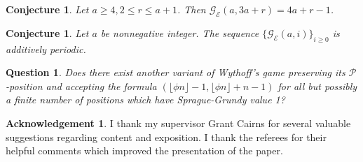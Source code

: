 \documentclass[12pt]{amsart}
\theoremstyle{plain}
\newtheorem{conjecture}[proposition]{Conjecture}
\newtheorem{question}[proposition]{Question}
\theoremstyle{definition}
\newtheorem*{ack}{Acknowledgement}
\theoremstyle{remark}
\begin{document}
\smallskip
\begin{conjecture}
Let $a \geq 4, 2 \leq r \leq a+1$. Then ${\mathcal{G}}_{\mathcal{E}}(a,3a+r) = 4a+r-1$.
\end{conjecture}

\smallskip
\begin{conjecture} \label{CW-additive}
Let $a$ be nonnegative integer. The sequence $\{{\mathcal{G}}_{\mathcal{E}}(a,i)\}_{i\geq 0}$ is additively periodic.
\end{conjecture}

\smallskip
\begin{question} \label{Q1}
Does there exist another variant of Wythoff's game preserving its ${\mathcal{P}}$-position and accepting the formula $(\lfloor \phi n \rfloor - 1, \lfloor \phi n \rfloor +n-1)$ for all but possibly a finite number of positions which have Sprague-Grundy value 1?
\end{question}

\smallskip
\begin{ack}
I thank my supervisor Grant Cairns for several valuable suggestions regarding content and exposition. I thank the referees for their helpful comments which improved the presentation of the paper.
\end{ack}

\small
\end{document}
